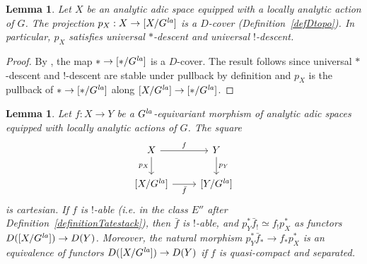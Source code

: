 \documentclass[a4paper,10pt]{amsart}
\theoremstyle{remark}
\theoremstyle{definition}
\theoremstyle{plain}
\newtheorem{lemma}[theorem]{Lemma}
\numberwithin{equation}{section}
\newcommand{\la}{{\it la}}
\begin{document}
\begin{lemma}\label{lemmaDcover}
	Let $X$ be an analytic adic space equipped with a locally analytic action of $G$. The projection $p_X: X\to [X/G^{\la}]$ is a $D$-cover (Definition~\ref{defDtopo}). In particular, $p_X$ satisfies universal $*$-descent and universal $!$-descent.
\end{lemma}
\begin{proof}
	By \cite[Prop.~6.2.3]{camargo2024analytic}, the map $*\to [*/G^{\la}]$ is a $D$-cover. The result follows since universal $*$-descent and $!$-descent are stable under pullback by definition and $p_X$ is the pullback of $*\rightarrow [*/G^{\la}]$ along $[X/G^{\la}]\rightarrow [*/G^{\la}]$.
\end{proof}
\begin{lemma}\label{lemmapullbackcohomology}
	Let $f\colon X\rightarrow Y$ be a $G^{\la}$-equivariant morphism of analytic adic spaces equipped with locally analytic actions of $G$. The square
	\[\begin{tikzcd}
		X \ar[r, "f"] \ar[d, "p_X"'] & Y \ar[d, "p_Y"] \\
		{[X/G^{\la}]} \ar[r, "\bar f"'] & {[Y/G^{\la}]}
	\end{tikzcd}\]
	is cartesian.  If $f$ is $!$-able (i.e. in the class $E''$ after Definition~\ref{definitionTatestack}), then $\bar f$ is $!$-able, and $p_Y^*\bar f_!\simeq f_!p_X^*$ as functors $D([X/G^{\la}])\rightarrow D(Y)$. Moreover, the natural morphism $p_Y^*\bar f_*\to f_*p_X^*$ is an equivalence of functors $D([X/G^{\la}])\rightarrow D(Y)$ if $f$ is quasi-compact and separated.
\end{lemma}
\end{document}

